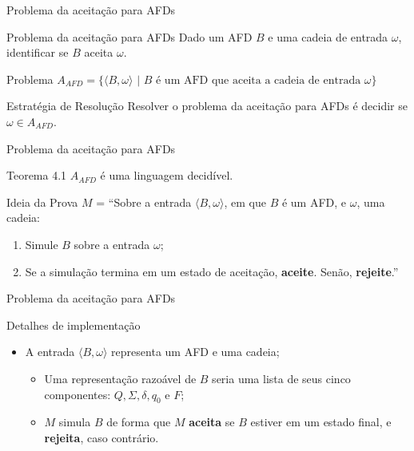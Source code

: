 \documentclass[xcolor=dvipsnames,table]{beamer}
\begin{document}
	\begin{frame}{Problema da aceitação para AFDs}
		\begin{block}{Problema da aceitação para AFDs}
			Dado um AFD $B$ e uma cadeia de entrada $\omega$, identificar se $B$ aceita $\omega$.
		\end{block}	 
		\begin{block}{Problema}
			$A_{AFD} = \{ \langle B, \omega \rangle \mbox{ | } B \mbox{ é um AFD que aceita a cadeia de entrada } \omega \}$
		\end{block}  
		\begin{block}{Estratégia de Resolução}
			Resolver o problema da aceitação para AFDs é decidir se $\omega \in A_{AFD}$.
		\end{block}
	\end{frame}
	
	\begin{frame}{Problema da aceitação para AFDs}
		\begin{block}{Teorema 4.1}
			$A_{AFD}$ é uma linguagem decidível.
		\end{block}  
		\begin{block}{Ideia da Prova}
			$M$ = ``Sobre a entrada $\langle B, \omega \rangle$, em que $B$ é um AFD, e $\omega$, uma cadeia:
			\begin{enumerate}
				\item Simule $B$ sobre a entrada $\omega$;
				\item Se a simulação termina em um estado de aceitação, {\bf aceite}. Senão, {\bf rejeite}.''
			\end{enumerate}
		\end{block}
	\end{frame}
	
	\begin{frame}{Problema da aceitação para AFDs}
		\begin{block}{Detalhes de implementação}
			\begin{itemize}
				\item A entrada $\langle B, \omega \rangle$ representa um AFD e uma cadeia;
				\begin{itemize}
					\item Uma representação razoável de $B$ seria uma lista de seus cinco componentes: $Q, \Sigma, \delta, q_0$ e $F$;
					\item $M$ simula $B$ de forma que $M$ {\bf aceita} se $B$ estiver em um estado final, e {\bf rejeita}, caso contrário.
				\end{itemize}
			\end{itemize}
		\end{block}
	\end{frame}
	
\end{document}
